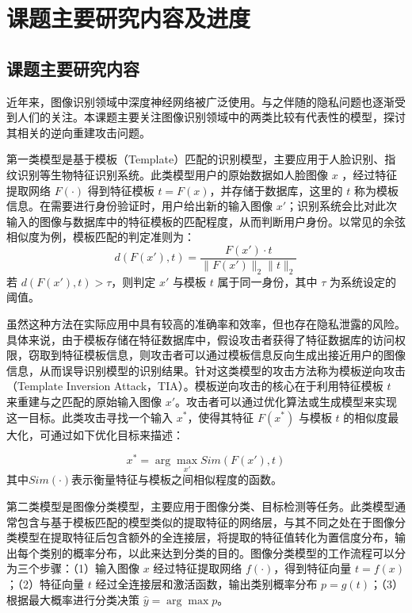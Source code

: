 \section{课题主要研究内容及进度}
\subsection{课题主要研究内容}
近年来，图像识别领域中深度神经网络被广泛使用。与之伴随的隐私问题也逐渐受到人们的关注。本课题主要关注图像识别领域中的两类比较有代表性的模型，探讨其相关的逆向重建攻击问题。

第一类模型是基于模板（Template）匹配的识别模型，主要应用于人脸识别、指纹识别等生物特征识别系统。此类模型用户的原始数据如人脸图像 $x$ ，经过特征提取网络 $F(\cdot)$ 得到特征模板 $t = F(x)$，并存储于数据库，这里的 $t$ 称为模板信息。在需要进行身份验证时，用户给出新的输入图像 $x'$；识别系统会比对此次输入的图像与数据库中的特征模板的匹配程度，从而判断用户身份。以常见的余弦相似度为例，模板匹配的判定准则为：
\begin{equation}
  d(F(x'), t) = \frac{F(x') \cdot t}{\| F(x') \|_2 \| t \|_2}
\end{equation}
若 $d(F(x'), t) > \tau$，则判定 $x'$ 与模板 $t$ 属于同一身份，其中 $\tau$ 为系统设定的阈值。

虽然这种方法在实际应用中具有较高的准确率和效率，但也存在隐私泄露的风险。具体来说，由于模板存储在特征数据库中，假设攻击者获得了特征数据库的访问权限，窃取到特征模板信息，则攻击者可以通过模板信息反向生成出接近用户的图像信息，从而误导识别模型的识别结果。针对这类模型的攻击方法称为模板逆向攻击（Template Inversion Attack，TIA）。模板逆向攻击的核心在于利用特征模板 $t$ 来重建与之匹配的原始输入图像 $x'$。攻击者可以通过优化算法或生成模型来实现这一目标。此类攻击寻找一个输入 $x^*$，使得其特征 $F(x^*)$ 与模板 $t$ 的相似度最大化，可通过如下优化目标来描述：

\begin{equation}
  x^* = \arg\max_{x'}Sim(F(x'), t)
\end{equation}
其中$Sim(\cdot)$表示衡量特征与模板之间相似程度的函数。


第二类模型是图像分类模型，主要应用于图像分类、目标检测等任务。此类模型通常包含与基于模板匹配的模型类似的提取特征的网络层，与其不同之处在于图像分类模型在提取特征后包含额外的全连接层，将提取的特征值转化为置信度分布，输出每个类别的概率分布，以此来达到分类的目的。图像分类模型的工作流程可以分为三个步骤：（1）输入图像 $x$ 经过特征提取网络 $f(\cdot)$，得到特征向量 $t = f(x)$；（2）特征向量 $t$ 经过全连接层和激活函数，输出类别概率分布 $p = g(t)$；（3）根据最大概率进行分类决策 $\hat{y} = \arg\max p$。

